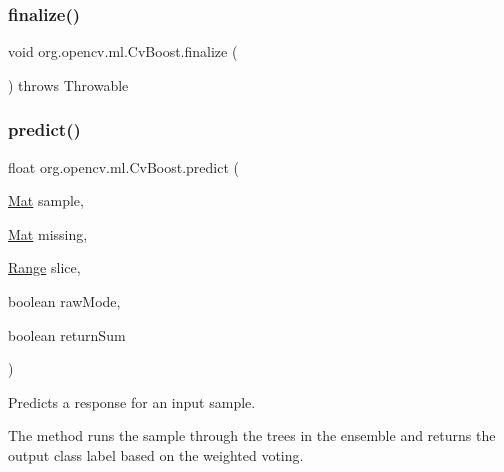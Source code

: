 \mbox{\label{classorg_1_1opencv_1_1ml_1_1_cv_boost_ac0bd199ed6a084cf601666acccfa54cb}} 
\subsubsection{\texorpdfstring{finalize()}{finalize()}}
{\footnotesize\ttfamily void org.\+opencv.\+ml.\+Cv\+Boost.\+finalize (\begin{DoxyParamCaption}{ }\end{DoxyParamCaption}) throws Throwable\hspace{0.3cm}{\ttfamily [protected]}}

\mbox{\label{classorg_1_1opencv_1_1ml_1_1_cv_boost_ae00e623e3bfb9cd65b15d4b785a3d7ee}} 
\subsubsection{\texorpdfstring{predict()}{predict()}\hspace{0.1cm}{\footnotesize\ttfamily [1/2]}}
{\footnotesize\ttfamily float org.\+opencv.\+ml.\+Cv\+Boost.\+predict (\begin{DoxyParamCaption}\item[{\mbox{\hyperlink{classorg_1_1opencv_1_1core_1_1_mat}{Mat}}}]{sample,  }\item[{\mbox{\hyperlink{classorg_1_1opencv_1_1core_1_1_mat}{Mat}}}]{missing,  }\item[{\mbox{\hyperlink{classorg_1_1opencv_1_1core_1_1_range}{Range}}}]{slice,  }\item[{boolean}]{raw\+Mode,  }\item[{boolean}]{return\+Sum }\end{DoxyParamCaption})}

Predicts a response for an input sample.

The method runs the sample through the trees in the ensemble and returns the output class label based on the weighted voting.


